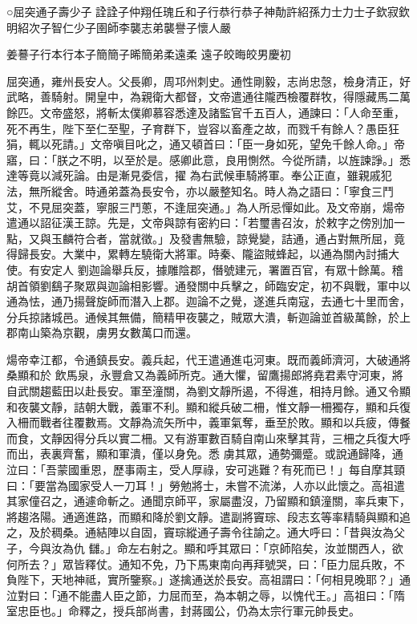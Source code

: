 
\begin{pinyinscope}

 ○屈突通子壽少子
 詮詮子仲翔任瑰丘和子行恭行恭子神勣許紹孫力士力士子欽寂欽明紹次子智仁少子圉師李襲志弟襲譽子懷人嚴



 姜謩子行本行本子簡簡子晞簡弟柔遠柔
 遠子皎晦皎男慶初



 屈突通，雍州長安人。父長卿，周邛州刺史。通性剛毅，志尚忠愨，檢身清正，好武略，善騎射。開皇中，為親衛大都督，文帝遣通往隴西檢覆群牧，得隱藏馬二萬餘匹。文帝盛怒，將斬太僕卿慕容悉達及諸監官千五百人，通諫曰：「人命至重，死不再生，陛下至仁至聖，子育群下，豈容以畜產之故，而戮千有餘人？愚臣狂狷，輒以死請。」文帝嗔目叱之，通又頓首曰：「臣一身如死，望免千餘人命。」帝寤，曰：「朕之不明，以至於是。感卿此意，良用惻然。今從所請，以旌諫諍。」悉達等竟以減死論。由是漸見委信，擢
 為右武候車騎將軍。奉公正直，雖親戚犯法，無所縱舍。時通弟蓋為長安令，亦以嚴整知名。時人為之語曰：「寧食三鬥艾，不見屈突蓋，寧服三鬥蔥，不逢屈突通。」為人所忌憚如此。及文帝崩，煬帝遣通以詔征漢王諒。先是，文帝與諒有密約曰：「若璽書召汝，於敕字之傍別加一點，又與玉麟符合者，當就徵。」及發書無驗，諒覺變，詰通，通占對無所屈，竟得歸長安。大業中，累轉左驍衛大將軍。時秦、隴盜賊蜂起，以通為關內討捕大使。有安定人
 劉迦論舉兵反，據雕陰郡，僭號建元，署置百官，有眾十餘萬。稽胡首領劉鷂子聚眾與迦論相影響。通發關中兵擊之，師臨安定，初不與戰，軍中以通為怯，通乃揚聲旋師而潛入上郡。迦論不之覺，遂進兵南寇，去通七十里而舍，分兵掠諸城邑。通候其無備，簡精甲夜襲之，賊眾大潰，斬迦論並首級萬餘，於上郡南山築為京觀，虜男女數萬口而還。



 煬帝幸江都，令通鎮長安。義兵起，代王遣通進屯河東。既而義師濟河，大破通將桑顯和於
 飲馬泉，永豐倉又為義師所克。通大懼，留鷹揚郎將堯君素守河東，將自武關趨藍田以赴長安。軍至潼關，為劉文靜所遏，不得進，相持月餘。通又令顯和夜襲文靜，詰朝大戰，義軍不利。顯和縱兵破二柵，惟文靜一柵獨存，顯和兵復入柵而戰者往覆數焉。文靜為流矢所中，義軍氣奪，垂至於敗。顯和以兵疲，傳餐而食，文靜因得分兵以實二柵。又有游軍數百騎自南山來擊其背，三柵之兵復大呼而出，表裏齊奮，顯和軍潰，僅以身免。悉
 虜其眾，通勢彌蹙。或說通歸降，通泣曰：「吾蒙國重恩，歷事兩主，受人厚祿，安可逃難？有死而已！」每自摩其頸曰：「要當為國家受人一刀耳！」勞勉將士，未嘗不流涕，人亦以此懷之。高祖遣其家僮召之，通遽命斬之。通聞京師平，家屬盡沒，乃留顯和鎮潼關，率兵東下，將趨洛陽。通適進路，而顯和降於劉文靜。遣副將竇琮、段志玄等率精騎與顯和追之，及於稠桑。通結陣以自固，竇琮縱通子壽令往諭之。通大呼曰：「昔與汝為父子，今與汝為仇
 讎。」命左右射之。顯和呼其眾曰：「京師陷矣，汝並關西人，欲何所去？」眾皆釋仗。通知不免，乃下馬東南向再拜號哭，曰：「臣力屈兵敗，不負陛下，天地神祗，實所鑒察。」遂擒通送於長安。高祖謂曰：「何相見晚耶？」通泣對曰：「通不能盡人臣之節，力屈而至，為本朝之辱，以愧代王。」高祖曰：「隋室忠臣也。」命釋之，授兵部尚書，封蔣國公，仍為太宗行軍元帥長史。




\end{pinyinscope}
